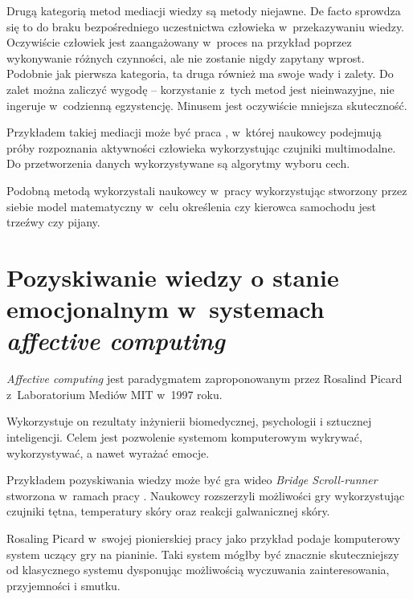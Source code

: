 Drugą kategorią metod mediacji wiedzy są metody niejawne. De facto sprowdza się to do braku bezpośredniego uczestnictwa człowieka w~przekazywaniu wiedzy. Oczywiście człowiek jest zaangażowany w~proces na przykład poprzez wykonywanie różnych czynności, ale nie zostanie nigdy zapytany wprost. Podobnie jak pierwsza kategoria, ta druga również ma swoje wady i zalety. Do zalet można zaliczyć wygodę -- korzystanie z~tych metod jest nieinwazyjne, nie ingeruje w~codzienną egzystencję. Minusem jest oczywiście mniejsza skuteczność.

Przykładem takiej mediacji może być praca \cite{zhang2011feature}, w~której naukowcy podejmują próby rozpoznania aktywności człowieka wykorzystując czujniki multimodalne. Do przetworzenia danych wykorzystywane są algorytmy wyboru cech.

Podobną metodą wykorzystali naukowcy w~pracy \cite{dai2010mobile} wykorzystując stworzony przez siebie model matematyczny w~celu określenia czy kierowca samochodu jest trzeźwy czy pijany.



\section{Pozyskiwanie wiedzy o stanie emocjonalnym w~systemach \textit{affective computing}}
\label{sec:pozyskiwanieWiedzyOStanieEmocjonalnymWSystemachAffectiveComputing}

\textit{Affective computing} jest paradygmatem zaproponowanym przez Rosalind Picard z~Laboratorium Mediów MIT w~1997 roku\cite{picard1997affective}.

Wykorzystuje on rezultaty inżynierii biomedycznej, psychologii i sztucznej inteligencji. Celem jest pozwolenie systemom komputerowym wykrywać, wykorzystywać, a nawet wyrażać emocje\cite{nalepa2017affective}.

Przykładem pozyskiwania wiedzy może być gra wideo \textit{Bridge Scroll-runner} stworzona w~ramach pracy \cite{nalepa2017affective}. Naukowcy rozszerzyli możliwości gry wykorzystując czujniki tętna, temperatury skóry oraz reakcji galwanicznej skóry.

Rosaling Picard w~swojej pionierskiej pracy \cite{picard1997affective} jako przykład podaje komputerowy system uczący gry na pianinie. Taki system mógłby być znacznie skuteczniejszy od klasycznego systemu dysponując możliwością wyczuwania zainteresowania, przyjemności i smutku.

